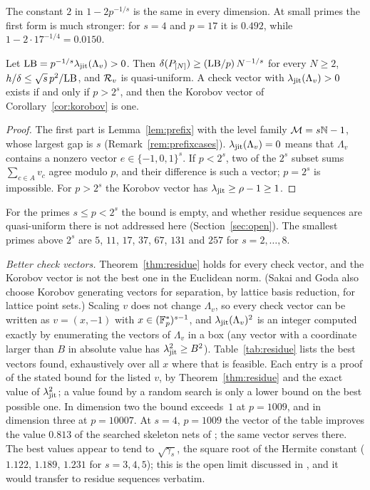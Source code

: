 The constant $2$ in $1-2p^{-1/s}$ is the same in every dimension. At small primes the first form is much stronger: for $s=4$ and $p=17$ it is $0.492$, while $1-2\cdot17^{-1/4}=0.0150$.

\begin{corollary}\label{cor:residueQU}
Let $\mathrm{LB}=p^{-1/s}\lambda_{\mathrm{jit}}(\Lambda_v)>0$. Then $\delta(P_{[N]})\ge(\mathrm{LB}/p)\,N^{-1/s}$ for every $N\ge2$, $h/\delta\le\sqrt s\,p^2/\mathrm{LB}$, and $\mathcal{R}_v$ is quasi-uniform. A check vector with $\lambda_{\mathrm{jit}}(\Lambda_v)>0$ exists if and only if $p>2^s$, and then the Korobov vector of Corollary~\ref{cor:korobov} is one.
\end{corollary}

\begin{proof}
The first part is Lemma~\ref{lem:prefix} with the level family $\mathcal{M}=s\mathbb{N}-1$, whose largest gap is $s$ (Remark~\ref{rem:prefixcases}). $\lambda_{\mathrm{jit}}(\Lambda_v)=0$ means that $\Lambda_v$ contains a nonzero vector $e\in\{-1,0,1\}^s$. If $p<2^s$, two of the $2^s$ subset sums $\sum_{c\in A}v_c$ agree modulo $p$, and their difference is such a vector; $p=2^s$ is impossible. For $p>2^s$ the Korobov vector has $\lambda_{\mathrm{jit}}\ge\rho-1\ge1$.
\end{proof}

For the primes $s\le p<2^s$ the bound is empty, and whether residue sequences are quasi-uniform there is not addressed here (Section~\ref{sec:open}). The smallest primes above $2^s$ are $5$, $11$, $17$, $37$, $67$, $131$ and $257$ for $s=2,\dots,8$.

\emph{Better check vectors.} Theorem~\ref{thm:residue} holds for every check vector, and the Korobov vector \cite{Kor59,SJ94} is not the best one in the Euclidean norm. (Sakai and Goda \cite{SG26} also choose Korobov generating vectors for separation, by lattice basis reduction, for lattice point sets.) Scaling $v$ does not change $\Lambda_v$, so every check vector can be written as $v=(x,-1)$ with $x\in(\mathbb{F}_p^*)^{s-1}$, and $\lambda_{\mathrm{jit}}(\Lambda_v)^2$ is an integer computed exactly by enumerating the vectors of $\Lambda_v$ in a box (any vector with a coordinate larger than $B$ in absolute value has $\lambda_{\mathrm{jit}}^2\ge B^2$). Table~\ref{tab:residue} lists the best vectors found, exhaustively over all $x$ where that is feasible. Each entry is a proof of the stated bound for the listed $v$, by Theorem~\ref{thm:residue} and the exact value of $\lambda_{\mathrm{jit}}^2$; a value found by a random search is only a lower bound on the best possible one. In dimension two the bound exceeds~$1$ at $p=1009$, and in dimension three at $p=10007$. At $s=4$, $p=1009$ the vector of the table improves the value $0.813$ of the searched skeleton nets of \cite{Gru26geo}%
; the same vector serves there. The best values appear to tend to $\sqrt{\gamma_s}$, the square root of the Hermite constant ($1.122$, $1.189$, $1.231$ for $s=3,4,5$); this is the open limit discussed in \cite{Gru26geo}%
, and it would transfer to residue sequences verbatim.

